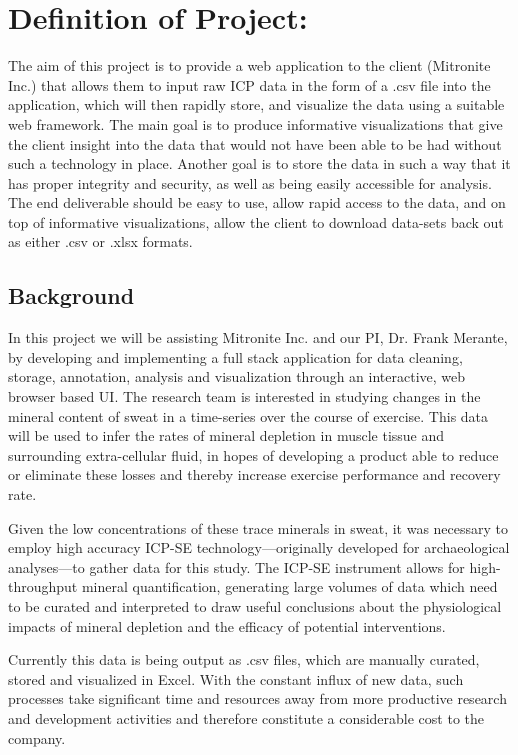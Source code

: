 \documentclass[10pt,twocolumn,letterpaper]{article}
\begin{document}
\section{Definition of Project:}
		
		The aim of this project is to provide a web application to the client (Mitronite Inc.) that allows them to input raw ICP data in the form of a .csv file into the 
		application, which will then rapidly store, and visualize the data using a suitable web framework.
		The main goal is to produce informative visualizations that give the client insight into the data that would not have been able to be had without such a technology in
		place.
		Another goal is to store the data in such a way that it has proper integrity and security, as well as being easily accessible for analysis.
		The end deliverable should be easy to use, allow rapid access to the data, and on top of informative visualizations, allow the client to download data-sets back out as
		either .csv or .xlsx formats.
		
            \subsection{Background}

            In this project we will be assisting Mitronite Inc. and our PI, Dr. Frank Merante, by developing and implementing a full stack application for data cleaning, storage,
	    annotation, analysis and visualization through an interactive, web browser based UI.
	    The research team is interested in studying changes in the mineral content of sweat in a time-series over the course of exercise. This data will be used to infer the
	    rates of mineral depletion in muscle tissue and surrounding extra-cellular fluid, in hopes of developing a product able to reduce or eliminate these losses and
	    thereby increase exercise performance and recovery rate.

            Given the low concentrations of these trace minerals in sweat, it was necessary to employ high accuracy ICP-SE technology---originally developed for archaeological analyses---to gather data for this study. The ICP-SE instrument allows for high-throughput mineral quantification, generating large volumes of data which need to be curated and interpreted to draw useful conclusions about the physiological impacts of mineral depletion and the efficacy of potential interventions.

            Currently this data is being output as .csv files, which are manually curated, stored and visualized in Excel. With the constant influx of new data, such processes take significant time and resources away from more productive research and development activities and therefore constitute a considerable cost to the company.
\end{document}
